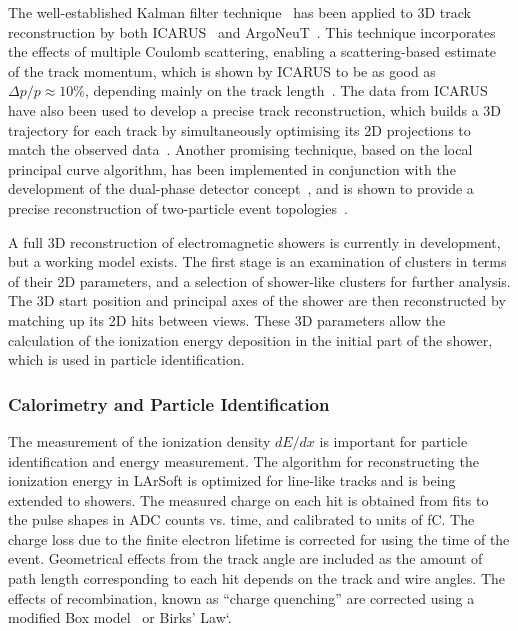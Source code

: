 The well-established Kalman filter technique~\cite{kalman} has been applied
to 3D track reconstruction by both ICARUS~\cite{REF1} and ArgoNeuT~\cite{REF2}.
This technique incorporates the effects of multiple Coulomb scattering,
enabling a scattering-based estimate of the track momentum,
which is shown by ICARUS to be as good as $\Delta p/p \approx 10\%$, 
depending mainly on the track length~\cite{REF3}.
The data from ICARUS have also been used to develop a precise
track reconstruction, which builds a 3D trajectory for each track by simultaneously
optimising its 2D projections to match the observed data~\cite{Antonello:2012hu}.
Another promising technique, based on the local principal curve algorithm, 
has been implemented in conjunction with the development of the 
dual-phase detector concept~\cite{REF4}, and is shown to provide 
a precise reconstruction of two-particle event topologies~\cite{REF5}. 

A full 3D reconstruction of electromagnetic showers is currently in development,
but a working model exists. The first stage is an examination of clusters 
in terms of their 2D parameters, and a selection of shower-like clusters 
for further analysis. The 3D start position and principal axes of the shower 
are then reconstructed by matching up its 2D hits between views.
These 3D parameters allow the calculation of the ionization energy deposition
in the initial part of the shower, which is used in particle identification. 


\subsubsection{Calorimetry and Particle Identification}

The measurement of the ionization density $dE/dx$ is important
for particle identification and energy measurement.
The algorithm for reconstructing the ionization
energy in LArSoft is optimized for line-like tracks and is being
extended to showers.  The measured charge on each hit is obtained from
fits to the pulse shapes in ADC counts vs. time, and calibrated to units
of fC.  The charge loss due to the finite electron lifetime is corrected for
using the time of the event.  Geometrical effects from the track angle are
included as the amount of path length corresponding to each hit depends on the
track and wire angles.  The effects of recombination, known as ``charge quenching''
are corrected using a modified Box model~\cite{Thomas:1987zz} or Birks' Law`\cite{Birks:1964zz}.

